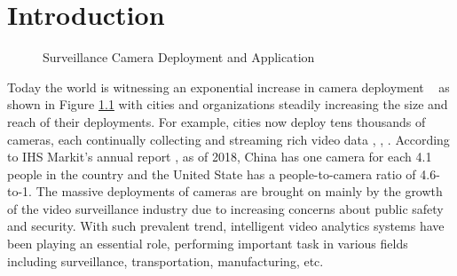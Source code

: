\chapter{Introduction}  %
\begin{figure}
\centering
{}
\caption{Surveillance Camera Deployment and Application}
\label{fig:cctv}
\end{figure}
Today the world is witnessing an exponential increase in camera deployment ~\citep{ananthanarayanan2019demo} as shown in Figure \ref{fig:cctv} with cities and organizations steadily increasing the size and reach of their deployments. For example, cities now deploy tens thousands of cameras, each continually collecting and streaming rich video data \cite{ref0}, \cite{ref1}, \cite{ref2}. According to IHS Markit’s annual report \cite{oliverreport}, as of 2018, China has one camera for each 4.1 people in the country and the United State has a people-to-camera ratio of 4.6-to-1. The massive deployments of cameras are brought on mainly by the growth of the video surveillance industry due to increasing concerns about public safety and security. With such prevalent trend, intelligent video analytics systems have been playing an essential role, performing important task in various fields including surveillance, transportation, manufacturing, etc.
